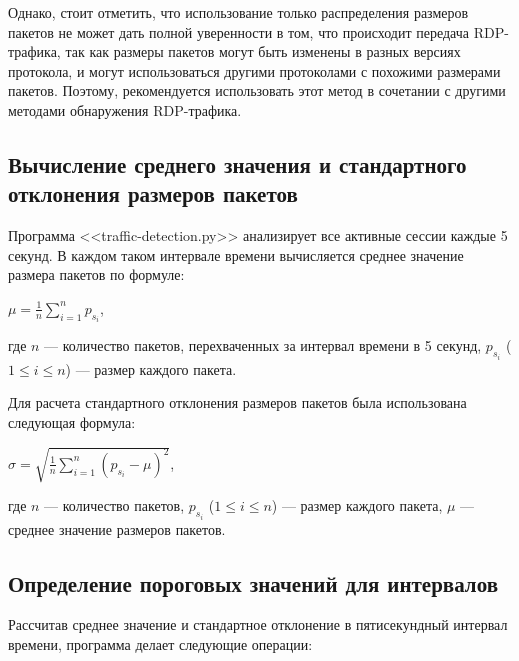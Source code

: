 \documentclass[bachelor, och, coursework]{SCWorks}
\begin{document}
Однако, стоит отметить, что использование только распределения размеров пакетов не может дать полной уверенности в том, 
что происходит передача RDP-трафика, так как размеры пакетов могут быть изменены в разных версиях протокола, и могут 
использоваться другими протоколами с похожими размерами пакетов. Поэтому, рекомендуется использовать этот метод в 
сочетании с другими методами обнаружения RDP-трафика.


\subsection{Вычисление среднего значения и стандартного отклонения размеров пакетов}

Программа <<traffic-detection.py>> анализирует все активные сессии каждые 5 секунд. В каждом таком интервале времени 
вычисляется среднее значение размера пакетов по формуле:

\begin{center}
  $\mu = \frac{1}{n}\sum_{i = 1}^{n} p_{s_i}$,
\end{center}

где $n$ --- количество пакетов, перехваченных за интервал времени в 5 секунд, $p_{s_i}$ ($1 \leq i \leq n$) --- размер каждого пакета.

Для расчета стандартного отклонения размеров пакетов была использована следующая формула:

\begin{center}
  $\sigma = \sqrt{\frac{1}{n} \sum_{i = 1}^{n} (p_{s_i} - \mu)^2}$,
\end{center}

где $n$ --- количество пакетов,  $p_{s_i}$ ($1 \leq i \leq n$) --- размер каждого пакета, 
$\mu$ --- среднее значение размеров пакетов.

\subsection{Определение пороговых значений для интервалов}

Рассчитав среднее значение и стандартное отклонение в пятисекундный интервал времени, программа делает следующие операции:
\end{document}
